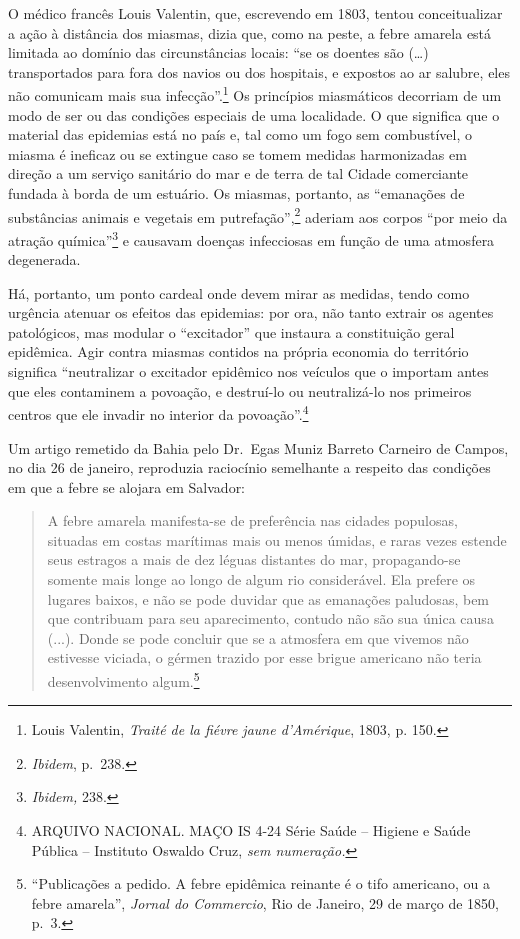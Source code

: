 O médico francês Louis Valentin, que, escrevendo em 1803, tentou
conceitualizar a ação à distância dos miasmas, dizia que, como na peste,
a febre amarela está limitada ao domínio das circunstâncias locais: ``se
os doentes são (\ldots{}) transportados para fora dos navios ou dos
hospitais, e expostos ao ar salubre, eles não comunicam mais sua
infecção''.\footnote{Louis Valentin, \emph{Traité de la fiévre jaune
  d'Amérique}, 1803, p. 150.} Os princípios miasmáticos decorriam de um
modo de ser ou das condições especiais de uma localidade. O que
significa que o material das epidemias está no país e, tal como um fogo
sem combustível, o miasma é ineficaz ou se extingue caso se tomem
medidas harmonizadas em direção a um serviço sanitário do mar e de terra
de tal Cidade comerciante fundada à borda de um estuário. Os miasmas,
portanto, as ``emanações de substâncias animais e vegetais em
putrefação'',\footnote{\emph{Ibidem}, p.~238.} aderiam aos corpos ``por
meio da atração química''\footnote{\emph{Ibidem,} 238.} e causavam
doenças infecciosas em função de uma atmosfera degenerada.

Há, portanto, um ponto cardeal onde devem mirar as medidas, tendo como
urgência atenuar os efeitos das epidemias: por ora, não tanto extrair os
agentes patológicos, mas modular o ``excitador'' que instaura a
constituição geral epidêmica. Agir contra miasmas contidos na própria
economia do território significa ``neutralizar o excitador epidêmico nos
veículos que o importam antes que eles contaminem a povoação, e
destruí-lo ou neutralizá-lo nos primeiros centros que ele invadir no
interior da povoação''.\footnote{ARQUIVO NACIONAL. MAÇO IS 4-24 Série
  Saúde -- Higiene e Saúde Pública -- Instituto Oswaldo Cruz, \emph{sem
  numeração.}}

Um artigo remetido da Bahia pelo Dr.~Egas Muniz Barreto Carneiro de
Campos, no dia 26 de janeiro, reproduzia raciocínio semelhante a
respeito das condições em que a febre se alojara em Salvador:

\begin{quote}
A febre amarela manifesta-se de preferência nas cidades populosas,
situadas em costas marítimas mais ou menos úmidas, e raras vezes estende
seus estragos a mais de dez léguas distantes do mar, propagando-se
somente mais longe ao longo de algum rio considerável. Ela prefere os
lugares baixos, e não se pode duvidar que as emanações paludosas, bem
que contribuam para seu aparecimento, contudo não são sua única causa
(...). Donde se pode concluir que se a atmosfera em que vivemos não
estivesse viciada, o gérmen trazido por esse brigue americano não teria
desenvolvimento algum.\footnote{``Publicações a pedido. A febre
  epidêmica reinante é o tifo americano, ou a febre amarela'',
  \emph{Jornal do Commercio}, Rio de Janeiro, 29 de março de 1850, p.~3.}
\end{quote}

